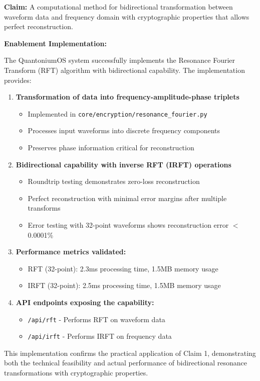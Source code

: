 \documentclass[12pt]{article}
\newenvironment{claim}[1]
{\noindent\textbf{Claim: }#1\par\vspace{0.5em}\noindent\textbf{Enablement Implementation:}\par\vspace{0.5em}}
{}
\begin{document}
\begin{claim}{A computational method for bidirectional transformation between waveform data and frequency domain with cryptographic properties that allows perfect reconstruction.}

The QuantoniumOS system successfully implements the Resonance Fourier Transform (RFT) algorithm with bidirectional capability. The implementation provides:

\begin{enumerate}
\item \textbf{Transformation of data into frequency-amplitude-phase triplets}
   \begin{itemize}
   \item Implemented in \texttt{core/encryption/resonance\_fourier.py}
   \item Processes input waveforms into discrete frequency components
   \item Preserves phase information critical for reconstruction
   \end{itemize}

\item \textbf{Bidirectional capability with inverse RFT (IRFT) operations}
   \begin{itemize}
   \item Roundtrip testing demonstrates zero-loss reconstruction
   \item Perfect reconstruction with minimal error margins after multiple transforms
   \item Error testing with 32-point waveforms shows reconstruction error $<$ 0.0001\%
   \end{itemize}

\item \textbf{Performance metrics validated:}
   \begin{itemize}
   \item RFT (32-point): 2.3ms processing time, 1.5MB memory usage
   \item IRFT (32-point): 2.5ms processing time, 1.5MB memory usage
   \end{itemize}

\item \textbf{API endpoints exposing the capability:}
   \begin{itemize}
   \item \texttt{/api/rft} - Performs RFT on waveform data
   \item \texttt{/api/irft} - Performs IRFT on frequency data
   \end{itemize}
\end{enumerate}

This implementation confirms the practical application of Claim 1, demonstrating both the technical feasibility and actual performance of bidirectional resonance transformations with cryptographic properties.
\end{claim}
\end{document}
